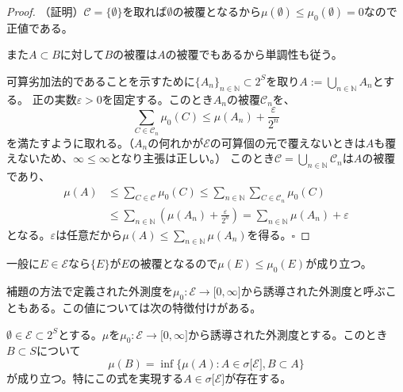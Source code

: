 \documentclass[../root.tex]{subfiles}
\begin{document}
\begin{proof}
（証明）$ \mathscr{C}=\lbrace \emptyset \rbrace $を取れば$ \emptyset $の被覆となるから$ \mu( \emptyset )\le\mu_{0}( \emptyset )=0 $なので正値である。

また$ A\subset B $に対して$ B $の被覆は$ A $の被覆でもあるから単調性も従う。

可算劣加法的であることを示すために$ \lbrace A_{n} \rbrace_{n\in\mathbb{N}}\subset 2^{S} $を取り$ A:=\bigcup_{n\in\mathbb{N}}A_{n} $とする。
正の実数$ \varepsilon\gt 0 $を固定する。このとき$ A_{n} $の被覆$ \mathscr{C}_{n} $を、
\[ \sum_{C\in\mathscr{C}_{n}}\mu_{0}( C )\le\mu( A_{n} )+\frac{\varepsilon}{2^{n}} \]
を満たすように取れる。（$ A_{n} $の何れかが$ \mathscr{E} $の可算個の元で覆えないときは$ A $も覆えないため、$ \infty \le \infty $となり主張は正しい。）
このとき$ \mathscr{C}=\bigcup_{n\in\mathbb{N}}\mathscr{C}_{n} $は$ A $の被覆であり、
\begin{align*}
\mu( A ) &\le \sum_{C\in\mathscr{C}}\mu_{0}( C ) \le \sum_{n\in\mathbb{N}}\sum_{C\in\mathscr{C}_{n}}\mu_{0}( C ) \\
&\le \sum_{n\in\mathbb{N}}\left( \mu( A_{n} )+\frac{\varepsilon}{2^{n}} \right) = \sum_{n\in\mathbb{N}}\mu( A_{n} )+\varepsilon
\end{align*}
となる。$ \varepsilon $は任意だから$ \mu( A )\le\sum_{n\in\mathbb{N}}\mu( A_{n} ) $を得る。$ \square $
\end{proof}

一般に$ E\in\mathscr{E} $なら$ \lbrace E \rbrace $が$ E $の被覆となるので$ \mu( E )\le\mu_{0}( E ) $が成り立つ。

補題の方法で定義された外測度を$ \mu_{0}\colon\mathscr{E}\rightarrow\lbrack 0, \infty \rbrack $から誘導された外測度と呼ぶこともある。この値については次の特徴付けがある。

\begin{Prop}{}{}
$ \emptyset\in\mathscr{E}\subset 2^{S} $とする。$ \mu $を$ \mu_{0}\colon\mathscr{E}\rightarrow\lbrack 0, \infty \rbrack $から誘導された外測度とする。このとき$ B\subset S $について
\[ \mu( B )=\inf\lbrace \mu( A ) : A\in\sigma\lbrack \mathscr{E} \rbrack, B\subset A \rbrace \]
が成り立つ。特にこの式を実現する$ A\in\sigma\lbrack \mathscr{E} \rbrack $が存在する。
\end{Prop}
\end{document}

